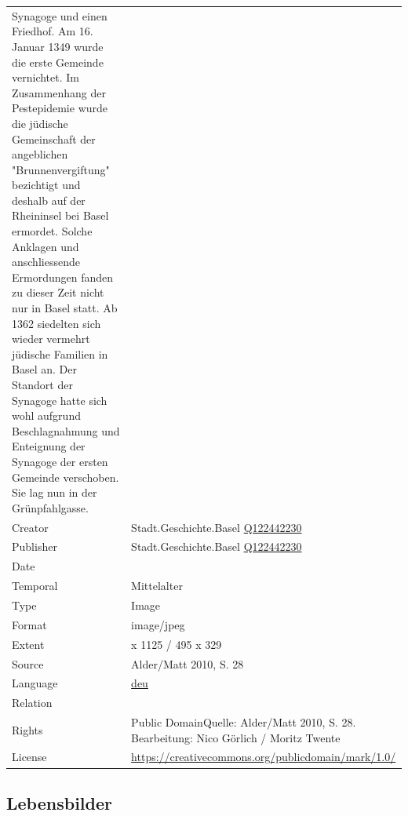 \documentclass[
  nswissgerman,
  letterpaper,
  DIV=11,
  numbers=noendperiod]{scrartcl}
\begin{document}
\begin{longtable}[]{@{}
  >{\raggedright\arraybackslash}p{}
  >{\raggedright\arraybackslash}p{}@{}}
Synagoge und einen Friedhof. Am 16. Januar 1349 wurde die erste Gemeinde
vernichtet. Im Zusammenhang der Pestepidemie wurde die jüdische
Gemeinschaft der angeblichen "Brunnenvergiftung" bezichtigt und deshalb
auf der Rheininsel bei Basel ermordet. Solche Anklagen und
anschliessende Ermordungen fanden zu dieser Zeit nicht nur in Basel
statt. Ab 1362 siedelten sich wieder vermehrt jüdische Familien in Basel
an. Der Standort der Synagoge hatte sich wohl aufgrund Beschlagnahmung
und Enteignung der Synagoge der ersten Gemeinde verschoben. Sie lag nun
in der Grünpfahlgasse.~ \\
Creator & Stadt.Geschichte.Basel
\href{https://www.wikidata.org/wiki/Q122442230}{Q122442230} \\
Publisher & Stadt.Geschichte.Basel
\href{https://www.wikidata.org/wiki/Q122442230}{Q122442230} \\
Date & 1398 \\
Temporal & Mittelalter \\
Type & Image \\
Format & image/jpeg \\
Extent & 1145 x 1125 / 495 x 329 \\
Source & Alder/Matt 2010, S. 28 \\
Language &
\href{https://www.loc.gov/standards/iso639-2/php/langcodes_name.php?code_ID=160}{deu} \\
Relation & \\
Rights & Public DomainQuelle: Alder/Matt 2010, S. 28. Bearbeitung: Nico
Görlich / Moritz Twente \\
License & \url{https://creativecommons.org/publicdomain/mark/1.0/} \\
\end{longtable}

\subsection{Lebensbilder}\label{lebensbilder}
\end{document}
